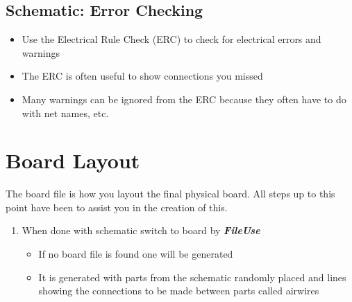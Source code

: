 \documentclass{article}
\begin{document}
\subsection{Schematic: Error Checking}
\begin{itemize}
    \item Use the Electrical Rule Check (ERC) to check for electrical errors
    and warnings
    \item The ERC is often useful to show connections you missed
    \item Many warnings can be ignored from the ERC because they often have to do with net names, etc.
\end{itemize}

\section{Board Layout}
The board file is how you layout the final physical board. All steps up to this point have been to assist you in the creation of this.
\begin{enumerate}
    \item When done with schematic switch to board by
    \textit{\textbf{File\textrightarrow Use}}
    \begin{itemize}
        \item If no board file is found one will be generated
        \item It is generated with parts from the schematic randomly placed and lines showing the connections to be made between parts called airwires
    \end{itemize}
\end{enumerate}
\end{document}
